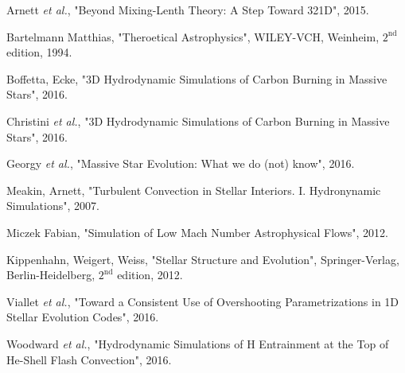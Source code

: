 

\begin{thebibliography}{9}
	
		Arnett \emph{et al.},
		  "Beyond Mixing-Lenth Theory: A Step Toward 321D",
			  2015.


		  Bartelmann Matthias,
		  "Theroetical Astrophysics",
		      WILEY-VCH, Weinheim,
		      $\mathrm{2^{nd}}$ edition,
			  1994.

		Boffetta, Ecke,
		  "3D Hydrodynamic Simulations of Carbon Burning in Massive Stars",
			  2016.
	
		Christini \emph{et al.},
		  "3D Hydrodynamic Simulations of Carbon Burning in Massive Stars",
			  2016.


		Georgy \emph{et al.},
		"Massive Star Evolution: What we do (not) know",
			  2016.

		  Meakin, Arnett,
		  "Turbulent Convection in Stellar Interiors. I. Hydronynamic Simulations",
			  2007.

		Miczek Fabian,
		  "Simulation of Low Mach Number Astrophysical Flows",
			  2012.


	
		  Kippenhahn, Weigert, Weiss,
		  "Stellar Structure and Evolution",
		      Springer-Verlag, Berlin-Heidelberg,
		        $\mathrm{2^{nd}}$ edition,
			  2012.

		Viallet \emph{et al.},
		  "Toward a Consistent Use of Overshooting Parametrizations in 1D Stellar Evolution Codes",
			  2016.

		Woodward \emph{et al.},
		  "Hydrodynamic Simulations of H Entrainment at the Top of He-Shell Flash Convection",
			  2016.
\end{thebibliography}
